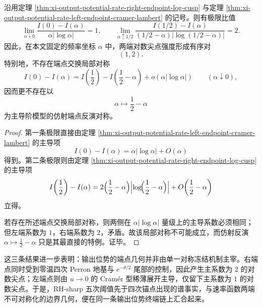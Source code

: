 \begin{corollary}[输出位势速率函数两端尖点强度的刚性不对称]\label{cor:xi-output-potential-endpoint-log-cusp-rigidity-pair}
沿用定理 \ref{thm:xi-output-potential-rate-right-endpoint-log-cusp} 与定理 \ref{thm:xi-output-potential-rate-left-endpoint-cramer-lambert} 的记号。则有极限比值
\[
\boxed{\;
\lim_{\alpha\downarrow0}\frac{I(0)-I(\alpha)}{\alpha|\log\alpha|}=1,
\qquad
\lim_{\alpha\uparrow1/2}\frac{I(1/2)-I(\alpha)}{(1/2-\alpha)|\log(1/2-\alpha)|}=2.\;}
\]
因此，在本文固定的频率坐标 \(\alpha\) 中，两端对数尖点强度形成有序对
\[
\boxed{\;(1,2).\;}
\]
特别地，不存在端点交换局部对称
\[
I(0)-I(\alpha)=I\!\left(\frac12\right)-I\!\left(\frac12-\alpha\right)+o(\alpha|\log\alpha|)
\qquad
(\alpha\downarrow0),
\]
因而更不存在以
\[
\alpha\longmapsto \frac12-\alpha
\]
为主导阶模型的仿射端点反演对称。
\end{corollary}
\begin{proof}
第一条极限直接由定理 \ref{thm:xi-output-potential-rate-left-endpoint-cramer-lambert} 的主导项
\[
I(0)-I(\alpha)=\alpha|\log\alpha|+O(\alpha)
\]
得到。第二条极限则由定理 \ref{thm:xi-output-potential-rate-right-endpoint-log-cusp} 的主导项
\[
I\!\left(\frac12\right)-I(\alpha)
=
2\Bigl(\frac12-\alpha\Bigr)\Bigl|\log\!\Bigl(\frac12-\alpha\Bigr)\Bigr|
+O\!\left(\frac12-\alpha\right)
\]
立得。

若存在所述端点交换局部对称，则两侧在 \(\alpha|\log\alpha|\) 量级上的主导系数必须相同；但左端系数为 \(1\)，右端系数为 \(2\)，矛盾。故该局部对称不可能成立，而仿射反演 \(\alpha\mapsto\frac12-\alpha\) 只是其最直接的特例。证毕。
\end{proof}

\noindent 这三条结果进一步表明：输出位势的端点几何并非由单一对称冻结机制主宰。右端点同时受到零温四次 Perron 地基与 \(e^{-\theta/2}\) 尾部的控制，因此产生主系数为 \(2\) 的对数尖点；左端点则由 \(u\to0\) 的 Cram\'er 型稀薄展开主导，仅留下主系数为 \(1\) 的对数尖点。于是，RH-sharp 五次阈值先于四次锚点出现的谱事实，与速率函数两端不可对称化的边界几何，便在同一条输出位势终端链上汇合起来。

\endinput

